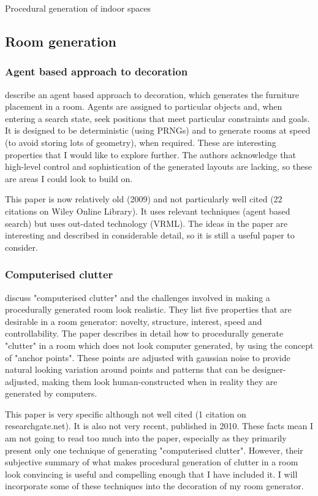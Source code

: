 \documentclass[review]{cmpreport}
\begin{document}
\begin{section}{Procedural generation of indoor spaces}

\subsection{Room generation}
\subsubsection{Agent based approach to decoration}
\cite{doi:10.1111/j.1467-8659.2009.01351.x} describe an agent based approach to decoration, which generates the furniture placement in a room. Agents are assigned to particular objects and, when entering a search state, seek positions that meet particular constraints and goals. It is designed to be deterministic (using PRNGs) and to generate rooms at speed (to avoid storing lots of geometry), when required. These are interesting properties that I would like to explore
further. The authors acknowledge that high-level control and sophistication of the generated layouts are lacking, so these are areas I could look to build on. \par
This paper is now relatively old (2009) and not particularly well cited (22 citations
on Wiley Online Library). It uses relevant techniques (agent based search) but uses
out-dated technology (VRML). The ideas in the paper are interesting and described in
considerable detail, so it is still a useful paper to consider. 

\subsubsection{Computerised clutter}
\cite{taylor-parberry} discuss "computerised clutter" and the challenges involved in making a procedurally generated room look realistic. They list five properties that are desirable in a room generator: novelty, structure, interest, speed and controllability. The paper describes in detail how to procedurally generate "clutter" in a room which does not look computer generated, by using the concept of "anchor points". These points are adjusted with gaussian noise to provide natural looking variation around points and patterns that can be designer-adjusted, making them look human-constructed when in reality they are generated by computers.\par
This paper is very specific although not well cited (1 citation on researchgate.net). It is also not very recent, published in 2010. These facts mean I am not going to read too much into the paper, especially as they primarily present only one technique of generating "computerised clutter". However, their subjective summary of what makes procedural generation of clutter in a room look convincing is useful and compelling enough that I have included it. I will incorporate some of these techniques into the decoration of my room generator.


\end{section}
\end{document}
